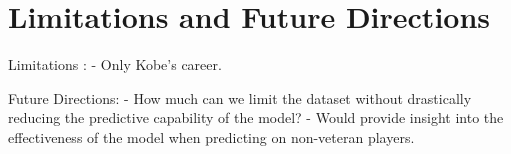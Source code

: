 \chapter{Limitations and Future Directions}\label{chap:discussion}




Limitations :
    - Only Kobe's career.


Future Directions:
    - How much can we limit the dataset without drastically reducing the predictive capability of the model?
        - Would provide insight into the effectiveness of the model when predicting on non-veteran players.


